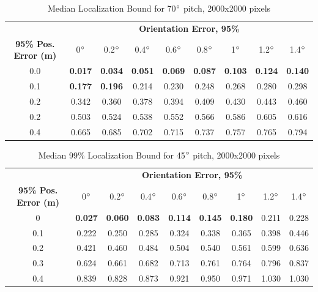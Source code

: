 \documentclass[a4paper,12pt,twoside,openright]{report}
\begin{document}
\begin{table}[htb]
\centering
\caption{Median Localization Bound for 70$\degree$ pitch, 2000x2000 pixels}
\label{tab:camera:70deg}

\begin{tabular}{ccccccccc}
\toprule
& \multicolumn{8}{c}{\textbf{Orientation Error, 95\%}} \\
\cmidrule(ll){2-9}
\multicolumn{1}{N}{\textbf{95\% Pos. Error (m)}} & 0$\degree$& 0.2$\degree$& 0.4$\degree$ & 0.6$\degree$ & 0.8$\degree$ & 1$\degree$ & 1.2$\degree$ & 1.4$\degree$\\
\cmidrule(lr){1-1}
\cmidrule(ll){2-9}
0.0 & \textbf{0.017} & \textbf{0.034} & \textbf{0.051} & \textbf{0.069} & \textbf{0.087} & \textbf{0.103} & \textbf{0.124} & \textbf{0.140} \\
0.1 & \textbf{0.177} & \textbf{0.196} & 0.214 & 0.230 & 0.248 & 0.268 & 0.280 & 0.298 \\
0.2 & 0.342 & 0.360 & 0.378 & 0.394 & 0.409 & 0.430 & 0.443 & 0.460  \\
0.2 & 0.503 & 0.524 & 0.538 & 0.552 & 0.566 & 0.586 & 0.605 & 0.616  \\
0.4 & 0.665 & 0.685 & 0.702 & 0.715 & 0.737 & 0.757 & 0.765 & 0.794  \\
\end{tabular} 
\end{table}


\begin{table}[htb]
\centering
\caption{Median 99\% Localization Bound for 45$\degree$ pitch, 2000x2000 pixels}
\label{tab:camera:45deg}

\begin{tabular}{ccccccccc}
\toprule
& \multicolumn{8}{c}{\textbf{Orientation Error, 95\%}} \\
\cmidrule(ll){2-9}
\multicolumn{1}{N}{\textbf{95\% Pos. Error (m)}} & 0$\degree$& 0.2$\degree$& 0.4$\degree$ & 0.6$\degree$ & 0.8$\degree$ & 1$\degree$ & 1.2$\degree$ & 1.4$\degree$\\
\cmidrule(lr){1-1}
\cmidrule(ll){2-9}
0 & \textbf{0.027} & \textbf{0.060} & \textbf{0.083} & \textbf{0.114} & \textbf{0.145} &\textbf{0.180} & 0.211 & 0.228 \\
0.1 & 0.222 & 0.250 & 0.285 & 0.324 & 0.338 & 0.365 & 0.398 & 0.446 \\
0.2 & 0.421 & 0.460 & 0.484 & 0.504 & 0.540 & 0.561 & 0.599 & 0.636 \\
0.3 & 0.624 & 0.661 & 0.682 & 0.713 & 0.761 & 0.764 & 0.796 & 0.837 \\
0.4 & 0.839 & 0.828 & 0.873 & 0.921 & 0.950 & 0.971 & 1.030 & 1.030 \\
\end{tabular} 
\end{table}
\end{document}
